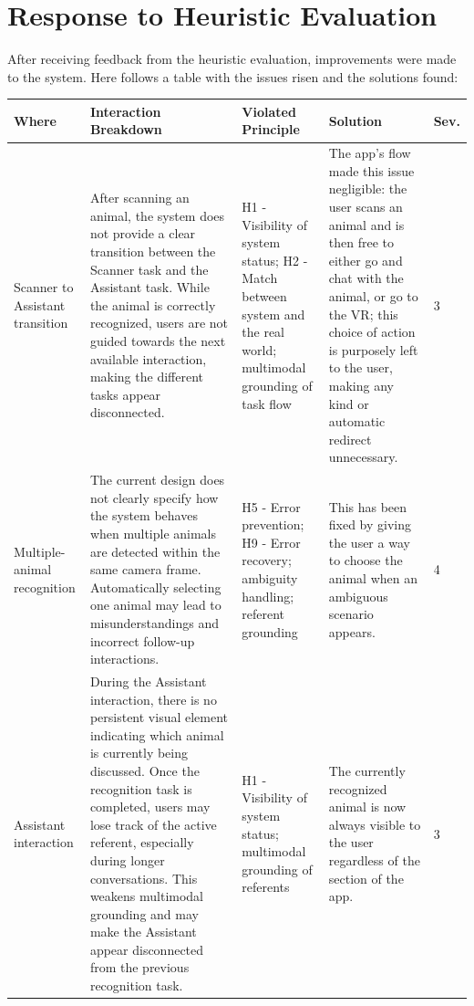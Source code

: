 \documentclass{article}
\begin{document}
\section{Response to Heuristic Evaluation}
After receiving feedback from the heuristic evaluation, improvements were made to the system. Here follows a table with the issues risen and the solutions found:
\begin{longtable}{L{0.10\textwidth} L{0.28\textwidth} L{0.20\textwidth} L{0.23\textwidth} C{0.05\textwidth}}

\toprule
\textbf{Where} & \textbf{Interaction Breakdown} & \textbf{Violated Principle} & \textbf{Solution} & \textbf{Sev.} \\
\midrule
\endhead
\bottomrule
\endfoot

Scanner to Assistant transition & After scanning an animal, the system does not provide a clear transition between the Scanner task and the Assistant task. While the animal is correctly recognized, users are not guided towards the next available interaction, making the different tasks appear disconnected. & H1 - Visibility of system status; H2 - Match between system and the real world; multimodal grounding of task flow & The app's flow made this issue negligible: the user scans an animal and is then free to either go and chat with the animal, or go to the VR; this choice of action is purposely left to the user, making any kind or automatic redirect unnecessary. & 3 \\
\midrule

Multiple-animal recognition & The current design does not clearly specify how the system behaves when multiple animals are detected within the same camera frame. Automatically selecting one animal may lead to misunderstandings and incorrect follow-up interactions. & H5 - Error prevention; H9 - Error recovery; ambiguity handling; referent grounding & This has been fixed by giving the user a way to choose the animal when an ambiguous scenario appears. & 4 \\
\midrule

Assistant interaction & During the Assistant interaction, there is no persistent visual element indicating which animal is currently being discussed. Once the recognition task is completed, users may lose track of the active referent, especially during longer conversations. This weakens multimodal grounding and may make the Assistant appear disconnected from the previous recognition task. & H1 - Visibility of system status; multimodal grounding of referents & The currently recognized animal is now always visible to the user regardless of the section of the app. & 3 \\
\midrule


\end{longtable}
\end{document}
